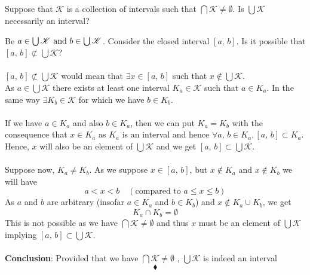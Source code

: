 \subsection{}
\begin{tcolorbox}
Suppose that $\mathscr{K}$ is a collection of intervals such that $\bigcap\mathscr{K}\neq \emptyset$. Is $\bigcup\mathscr{K}$ necessarily an interval?
\end{tcolorbox}
Be $a\in \bigcup \mathscr{K}\text{ and } b\in \bigcup \mathscr{K}$. Consider the closed interval $[a,\, b]$. Is it possible that $[a,\, b]\not \subset \bigcup \mathscr{K}$?\\\\
$[a,\, b]\not \subset \bigcup \mathscr{K}$ would mean that $\exists x\in [a,\, b]$ such that $x\not\in \bigcup \mathscr{K}$.\\
As $a\in \bigcup \mathscr{K}$ there exists at least one interval $K_a\in \mathscr{K}$ such that $a\in K_a$. In the same way $\exists K_b\in\mathscr{K}$ for which we have $b\in K_b$.\\\\
If we have $a\in K_a$ and also $b\in K_a$, then we can put $K_a=K_b$ with the consequence that  $x\in K_a$ as $K_a$ is an interval and hence $\forall a,\, b\in K_a, [a,\, b]\subset K_a$.\\
Hence, $x$ will also be an element of $\bigcup \mathscr{K}$ and we get $[a,\, b]\subset \bigcup \mathscr{K}$.\\\\
Suppose now, $K_a\neq K_b$. As we suppose $x\in [a,\, b]$, but $x\not\in K_a$ and $x\not\in K_b$ we will have 
$$a<x<b\quad(\text{compared to } a\leq x\leq b)$$
As $a$ and $b$ are arbitrary (insofar $a\in K_a$ and $b\in K_b$) and $x\not \in K_a\cup K_b$, we get $$K_a\cap K_b=\emptyset$$
This is not possible as we have $\bigcap\mathscr{K}\neq \emptyset$ and thus $x$ must be an element of $\bigcup \mathscr{K}$ implying $[a,\, b]\subset \bigcup \mathscr{K}$.\\\\
\textbf{Conclusion}: Provided that we have $\bigcap\mathscr{K}\neq \emptyset$ , $\bigcup \mathscr{K}$ is indeed an interval 
$$\blacklozenge$$
\newpage


\renewcommand{\thesubsection}{\thesection.\arabic{subsection}}
\setcounter{subsection}{0}

